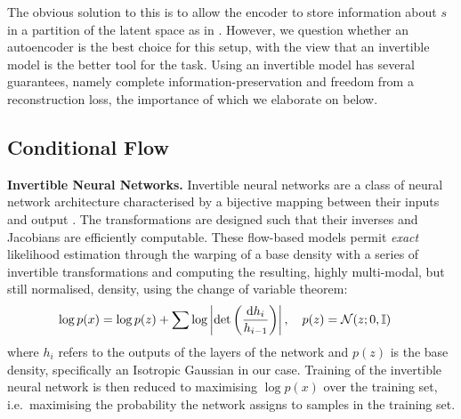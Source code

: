 The obvious solution to this is to allow the encoder to store information about $s$ in a partition of the latent space as in  \cite{creager2019flexibly}.  However, we question whether an autoencoder is the best choice for this setup, with the view that an invertible model is the better tool for the task. Using an invertible model has several guarantees, namely complete information-preservation and freedom from a reconstruction loss, the importance of which we elaborate on below.

\subsection{Conditional Flow}\label{cflow}
\textbf{Invertible Neural Networks.}
Invertible neural networks are a class of neural network architecture characterised by a bijective mapping between their inputs and output \cite{Dinh2014}. The transformations are designed such that their inverses and Jacobians are efficiently computable.
These flow-based models permit \emph{exact} likelihood estimation \cite{normflows2015} through the warping of a base density with a series of invertible transformations and computing the resulting, highly multi-modal, but still normalised, density, using the change of variable theorem:
\begin{align}
\begin{split}
  \log p(x) &= \log p(z) + 
   \sum \log \left| \det\left( \frac{\diff h_i}{ h_{i-1}}\right) \right|, %
  \quad p(z) = \mathcal{N}(z; 0, \mathbb{I})
  \label{eq:changeofvariables}
\end{split}
\end{align}
where $h_i$ refers to the outputs of the layers of the network and $p(z)$ is the base density, specifically an Isotropic Gaussian in our case.
Training of the invertible neural network is then reduced to maximising $\log p(x)$ over the training set,
i.e.\ maximising the probability the network assigns to samples in the training set.


